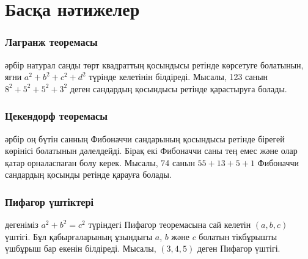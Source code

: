 \section{Басқа нәтижелер}

\subsubsection{Лагранж теоремасы}


әрбір натурал санды төрт квадраттың қосындысы 
ретінде көрсетуге болатынын, яғни $a^2+b^2+c^2+d^2$ түрінде келетінін білдіреді. 
Мысалы, 123 санын $8^2+5^2+5^2+3^2$ деген сандардың қосындысы
ретінде қарастыруға болады.

\subsubsection{Цекендорф теоремасы}


әрбір оң бүтін санның Фибоначчи сандарының қосындысы ретінде бірегей көрінісі болатынын дәлелдейді. Бірақ екі Фибоначчи саны тең емес және олар қатар орналаспаған болу керек.
Мысалы, 74 санын $55+13+5+1$ Фибоначчи сандардың қосынды ретінде қарауға болады.

\subsubsection{Пифагор үштіктері}


 дегеніміз $a^2+b^2=c^2$ түріндегі Пифагор теоремасына 
сай келетін $(a,b,c)$ үштігі. Бұл қабырғаларының ұзындығы 
$a$, $b$ және $c$ болатын тікбұрышты үшбұрыш бар екенін білдіреді.
Мысалы, $(3,4,5)$ деген Пифагор үштігі.

